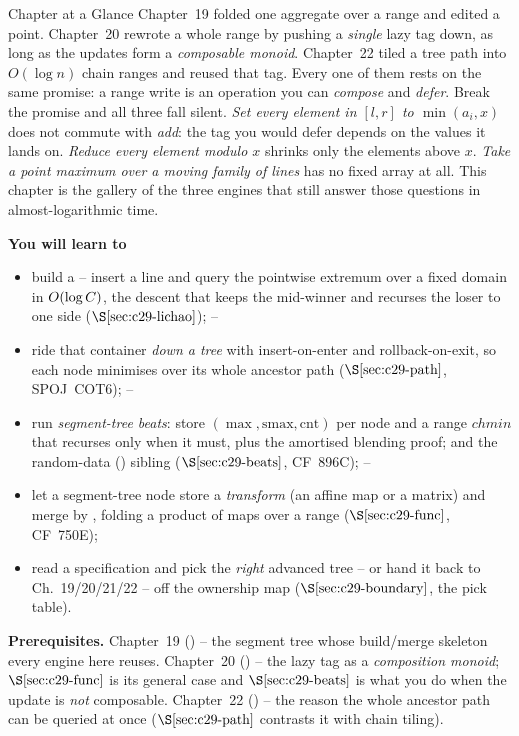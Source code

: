 \begin{chaptertheorybox}{Chapter at a Glance}
Chapter~19 folded one aggregate over a range and edited a point.  Chapter~20
rewrote a whole range by pushing a \emph{single} lazy tag down, as long as the
updates form a \emph{composable monoid}.  Chapter~22 tiled a tree path into
\(O(\log n)\) chain ranges and reused that tag.  Every one of them rests on the
same promise: a range write is an operation you can \emph{compose} and
\emph{defer}.  Break the promise and all three fall silent.  \emph{Set every
element in \([l,r]\) to \(\min(a_i,x)\)} does not commute with \emph{add}: the
tag you would defer depends on the values it lands on.  \emph{Reduce every
element modulo \(x\)} shrinks only the elements above \(x\).  \emph{Take a point
maximum over a moving family of lines} has no fixed array at all.  This chapter
is the gallery of the three engines that still answer those questions in
almost-logarithmic time.

\textbf{You will learn to}
\begin{itemize}[nosep]
  \item build a  -- insert a line and query the
        pointwise extremum over a fixed domain in \(O(\log C)\), the descent
        that keeps the mid-winner and recurses the loser to one side
        (\(\secref{c29-lichao}\)); \hfill{}--
  \item ride that container \emph{down a tree} with insert-on-enter and
        rollback-on-exit, so each node minimises over its whole ancestor path
        (\(\secref{c29-path}\), SPOJ~COT6); \hfill{}--
  \item run \emph{segment-tree beats}: store \((\max,\mathrm{smax},\mathrm{cnt})\) per
        node and a range \(\mathit{chmin}\) that recurses only when it must, plus
        the amortised blending proof; and the random-data 
        () sibling (\(\secref{c29-beats}\), CF~896C); \hfill{}--
  \item let a segment-tree node store a \emph{transform} (an affine map or a
        matrix) and merge by , folding a product of
        maps over a range (\(\secref{c29-func}\), CF~750E); \hfill{}
  \item read a specification and pick the \emph{right} advanced tree -- or hand
        it back to Ch.~19/20/21/22 -- off the ownership map
        (\(\secref{c29-boundary}\), the pick table). \hfill{}
\end{itemize}

\textbf{Prerequisites.} Chapter~19 () -- the segment tree whose
build/merge skeleton every engine here reuses.  Chapter~20 () -- the
lazy tag as a \emph{composition monoid}; \(\secref{c29-func}\) is its general
case and \(\secref{c29-beats}\) is what you do when the update is \emph{not}
composable.  Chapter~22 () -- the reason the whole ancestor path can
be queried at once (\(\secref{c29-path}\) contrasts it with chain tiling).
\end{chaptertheorybox}

